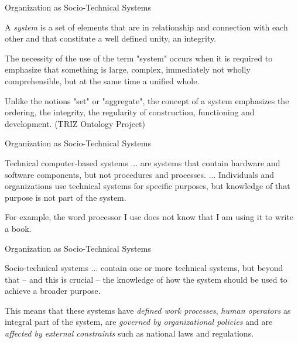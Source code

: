 \documentclass{beamer}
\begin{document}
\begin{frame}{Organization as Socio-Technical Systems}

  A \emph{system} is a set of elements that are in relationship and connection
  with each other and that constitute a well defined unity, an integrity.

  The necessity of the use of the term "system" occurs when it is required to
  emphasize that something is large, complex, immediately not wholly
  comprehensible, but at the same time a unified whole.

  Unlike the notions "set" or "aggregate", the concept of a system emphasizes
  the ordering, the integrity, the regularity of construction, functioning and
  development.  (TRIZ Ontology Project)
\end{frame}
\begin{frame}{Organization as Socio-Technical Systems}
  \begin{block} {Technical computer-based systems}
    ... are systems that contain hardware and software components, but not
    procedures and processes. ... Individuals and organizations use technical
    systems for specific purposes, but knowledge of that purpose is not part
    of the system.\medskip

    For example, the word processor I use does not know that I am using it to
    write a book.
  \end{block}

\end{frame}

\begin{frame}{Organization as Socio-Technical Systems}

  \begin{block}{Socio-technical systems}
    ... contain one or more technical systems, but beyond that -- and this is
    crucial -- the knowledge of how the system should be used to achieve a
    broader purpose.\medskip

    This means that these systems have \emph{defined work processes},
    \emph{human operators} as integral part of the system, are \emph{governed
      by organizational policies} and are \emph{affected by external
      constraints} such as national laws and regulations.
  \end{block}

\end{frame}
\end{document}
